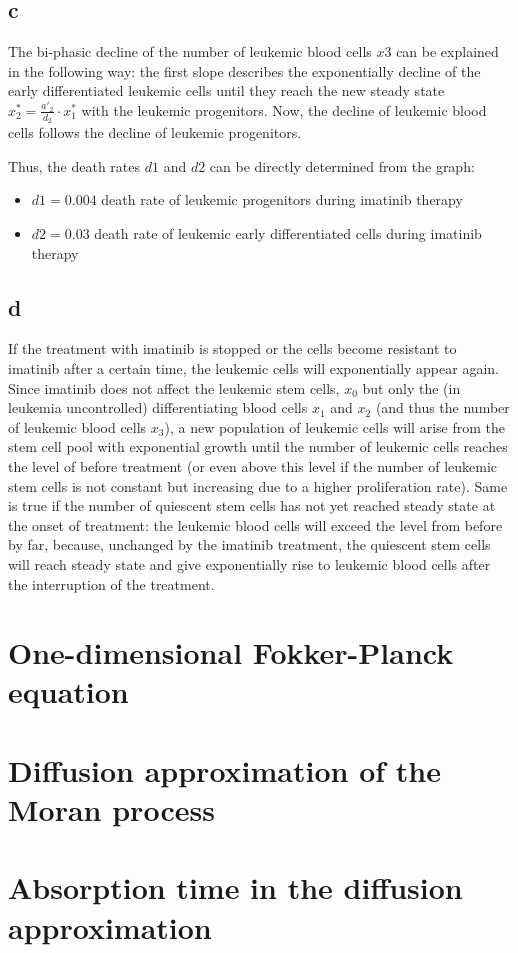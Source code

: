 \subsection{c}

The bi-phasic decline of the number of leukemic blood cells $x3$ can be explained in the
following way: the first slope describes the exponentially decline of the early differentiated leukemic
cells until they reach the new steady state $x^*_2 = \frac{a'_2}{d_2} \cdot x^*_1$ with the leukemic progenitors. Now, the decline of leukemic blood cells follows the decline of leukemic progenitors. 

Thus, the death rates $d1$ and $d2$ can be directly determined from the graph:
\begin{itemize}
\item $d1 = 0.004$  death rate of leukemic progenitors during imatinib therapy
\item $d2 = 0.03$  death rate of leukemic early differentiated cells during imatinib therapy
\end{itemize}

\subsection{d}

If the treatment with imatinib is stopped or the cells become resistant to imatinib after a certain time, the leukemic cells will exponentially appear again. Since imatinib does not affect the leukemic stem cells, $x_0$ but only the (in leukemia uncontrolled) differentiating blood cells $x_1$ and $x_2$ (and thus the number of leukemic blood cells $x_3$), a new population of leukemic cells will arise from the stem cell pool with exponential growth until the number of leukemic cells reaches the level of before treatment (or even above this level if the number of leukemic stem cells is not constant but increasing due to a higher proliferation rate).
Same is true if the number of quiescent stem cells has not yet reached steady state at the onset of treatment: the leukemic blood cells will exceed the level from before by far, because, unchanged by the imatinib treatment, the quiescent stem cells will reach steady state and give exponentially rise to leukemic blood cells after the interruption of the treatment.

\setcounter{chapter}{4}
\setcounter{section}{0}
\section{One-dimensional Fokker-Planck equation}

\setcounter{chapter}{5}
\setcounter{section}{0}
\section{Diffusion approximation of the Moran process}

\setcounter{chapter}{6}
\setcounter{section}{0}
\section{Absorption time in the diffusion approximation}
